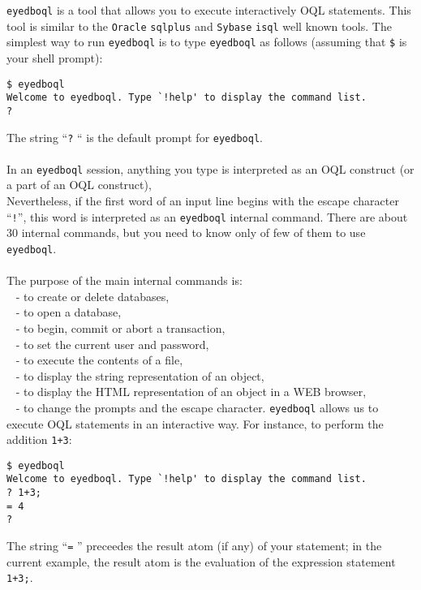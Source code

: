 \texttt{eyedboql} is a tool that allows you to execute interactively OQL 
statements.
This tool is similar to the \texttt{Oracle} \texttt{sqlplus} and \texttt{Sybase}
\texttt{isql} well known tools.
The simplest way to run \texttt{eyedboql} is to type \texttt{eyedboql}
as follows (assuming that \texttt{\$} is your shell prompt):
\verbsize
\begin{verbatim}
$ eyedboql
Welcome to eyedboql. Type `!help' to display the command list.
?
\end{verbatim}
\normalsize
The string ``\texttt{?} `` is the default prompt for \texttt{eyedboql}.
\\
\\
In an \texttt{eyedboql} session, anything you type is interpreted as an
OQL construct (or a part of an OQL construct),
\\
Nevertheless, if the first word of an input line begins with the escape
character ``\texttt{!}'', this word is interpreted as an \texttt{eyedboql}
internal command.
There are about 30 internal commands, but you need to know only of few of them
to use \texttt{eyedboql}.\\
\\
The purpose of the main internal commands is:\\
\mbox{ } - to create or delete databases,\\
\mbox{ } - to open a database,\\
\mbox{ } - to begin, commit or abort a transaction,\\
\mbox{ } - to set the current user and password,\\
\mbox{ } - to execute the contents of a file,\\
\mbox{ } - to display the string representation of an object,\\
\mbox{ } - to display the HTML representation of an object in a WEB browser,\\
\mbox{ } - to change the prompts and the escape character.
\texttt{eyedboql} allows us to execute OQL statements in an interactive way.
For instance, to perform the addition \texttt{1+3}:
\verbsize
\begin{verbatim}
$ eyedboql
Welcome to eyedboql. Type `!help' to display the command list.
? 1+3;
= 4
?
\end{verbatim}
\normalsize
The string ``\texttt{=} '' preceedes the result atom (if any) of your statement;
in the current example, the result atom is the evaluation of the expression
statement \texttt{1+3;}.
